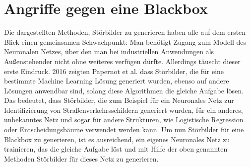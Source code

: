 \section{Angriffe gegen eine Blackbox}
Die dargestellten Methoden, Störbilder zu generieren haben alle auf dem ersten Blick einen gemeinsamen Schwachpunkt:
Man benötigt Zugang zum Modell des Neuronalen Netzes, über den man bei industriellen Anwendungen als Außenstehender nicht ohne weiteres verfügen dürfte.
Allerdings täuscht dieser erste Eindruck.
2016 zeigten Papernot et al. dass Störbilder, die für eine bestimmte Machine Learning Lösung generiert wurden, ebenso auf andere Lösungen anwendbar sind, solang diese Algorithmen die gleiche Aufgabe lösen. Das bedeutet, dass Störbilder, die zum Beispiel für ein Neuronales Netz zur Identifizierung von Straßenverkehrsschildern generiert wurden, für ein anderes, unbekanntes Netz und sogar für andere Strukturen, wie Logistische Regression oder Entscheidungsbäume verwendet werden kann.
Um nun Störbilder für eine Blackbox zu generieren, ist es ausreichend, ein eigenes Neuronales Netz zu trainieren, das die gleiche Aufgabe löst und mit Hilfe der oben genannten Methoden Störbilder für dieses Netz zu generieren.